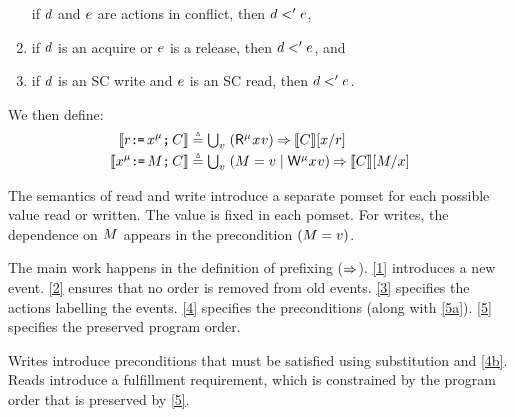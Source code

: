 \begin{candidate}
\begin{enumerate}
  if $d$ and $e$ are \external actions in conflict,
  then $d<'e$, %
\item[{\labeltextsc[P5c]{(P5c)}{5c}}]
  if $d$ is an acquire or $e$ is a release, then $d <' e$, and
\item[{\labeltextsc[P5d]{(P5d)}{5d}}]
  if $d$ is an SC write and $e$ is an SC read, then $d <' e$.
\end{enumerate}
  We then define:
  \begin{gather*}
    \begin{aligned}[t]
      \sem{\aReg\GETS\aLoc^\amode\SEMI \aCmd} & \eqdef \textstyle\bigcup_\aVal\;
      (\DRmode\aLoc\aVal) \prefix \sem{\aCmd} [\aLoc/\aReg]
      \\
      \sem{\aLoc^\amode\GETS\aExp\SEMI \aCmd} & \eqdef
      \textstyle\bigcup_\aVal\; (\aExp=\aVal \mid \DWmode\aLoc\aVal)
      \prefix \sem{\aCmd}[\aExp/\aLoc]
    \end{aligned}
  \end{gather*}
\end{candidate}

The semantics of read and write introduce a separate pomset for each possible
value read or written.  The value is fixed in each pomset.  For writes, the
dependence on $M$ appears in the precondition $(M=v)$.

The main work happens in the definition of prefixing ($\mathbin\Rightarrow$).  \ref{1}
introduces a new event.  \ref{2} ensures that no order is removed from old
events.  \ref{3} specifies the actions labelling the events.  \ref{4}
specifies the preconditions (along with \ref{5a}).  \ref{5} specifies the
preserved program order.

Writes introduce preconditions that must be satisfied using substitution and
\ref{4b}.  Reads introduce a fulfillment requirement, which is constrained by
the program order that is preserved by \ref{5}.

